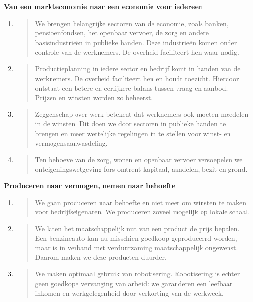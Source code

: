 \textbf{Van een markteconomie naar een economie voor iedereen}

\begin{enumerate}
\def\labelenumi{\arabic{enumi}.}
\item
  \begin{quote}
  We brengen belangrijke sectoren van de economie, zoals banken,
  pensioenfondsen, het openbaar vervoer, de zorg en andere
  basisindustrieën in publieke handen. Deze industrieën komen onder
  controle van de werknemers. De overheid faciliteert hen waar nodig.
  \end{quote}
\item
  \begin{quote}
  Productieplanning in iedere sector en bedrijf komt in handen van de
  werknemers. De overheid faciliteert hen en houdt toezicht. Hierdoor
  ontstaat een betere en eerlijkere balans tussen vraag en aanbod.
  Prijzen en winsten worden zo beheerst.
  \end{quote}
\item
  \begin{quote}
  Zeggenschap over werk betekent dat werknemers ook moeten meedelen in
  de winsten. Dit doen we door sectoren in publieke handen te brengen en
  meer wettelijke regelingen in te stellen voor winst- en
  vermogensaanwasdeling.
  \end{quote}
\item
  \begin{quote}
  Ten behoeve van de zorg, wonen en openbaar vervoer versoepelen we
  onteigeningswetgeving fors omtrent kapitaal, aandelen, bezit en grond.
  \end{quote}
\end{enumerate}

\textbf{Produceren naar vermogen, nemen naar behoefte}

\begin{enumerate}
\def\labelenumi{\arabic{enumi}.}
\item
  \begin{quote}
  We gaan produceren naar behoefte en niet meer om winsten te maken voor
  bedrijfseigenaren. We produceren zoveel mogelijk op lokale schaal.
  \end{quote}
\item
  \begin{quote}
  We laten het maatschappelijk nut van een product de prijs bepalen. Een
  benzineauto kan nu misschien goedkoop geproduceerd worden, maar is in
  verband met verduurzaming maatschappelijk ongewenst. Daarom maken we
  deze producten duurder.
  \end{quote}
\item
  \begin{quote}
  We maken optimaal gebruik van robotisering. Robotisering is echter
  geen goedkope vervanging van arbeid: we garanderen een leefbaar
  inkomen en werkgelegenheid door verkorting van de werkweek.
  \end{quote}
\end{enumerate}

